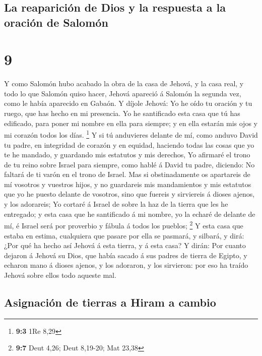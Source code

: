 \hypertarget{la-reapariciuxf3n-de-dios-y-la-respuesta-a-la-oraciuxf3n-de-salomuxf3n}{%
\subsection{La reaparición de Dios y la respuesta a la oración de
Salomón}\label{la-reapariciuxf3n-de-dios-y-la-respuesta-a-la-oraciuxf3n-de-salomuxf3n}}

\hypertarget{section-8}{%
\section{9}\label{section-8}}

 Y como Salomón hubo acabado la obra de la casa de Jehová,
y la casa real, y todo lo que Salomón quiso hacer,  Jehová
apareció á Salomón la segunda vez, como le había aparecido en Gabaón.
 Y díjole Jehová: Yo he oído tu oración y tu ruego, que
has hecho en mi presencia. Yo he santificado esta casa que tú has
edificado, para poner mi nombre en ella para siempre; y en ella estarán
mis ojos y mi corazón todos los días. \footnote{\textbf{9:3} 1Re 8,29}
 Y si tú anduvieres delante de mí, como anduvo David tu
padre, en integridad de corazón y en equidad, haciendo todas las cosas
que yo te he mandado, y guardando mis estatutos y mis derechos,
 Yo afirmaré el trono de tu reino sobre Israel para
siempre, como hablé á David tu padre, diciendo: No faltará de ti varón
en el trono de Israel.  Mas si obstinadamente os
apartareis de mí vosotros y vuestros hijos, y no guardareis mis
mandamientos y mis estatutos que yo he puesto delante de vosotros, sino
que fuereis y sirviereis á dioses ajenos, y los adorareis;
 Yo cortaré á Israel de sobre la haz de la tierra que les
he entregado; y esta casa que he santificado á mi nombre, yo la echaré
de delante de mí, é Israel será por proverbio y fábula á todos los
pueblos; \footnote{\textbf{9:7} Deut 4,26; Deut 8,19-20; Mat 23,38}
 Y esta casa que estaba en estima, cualquiera que pasare
por ella se pasmará, y silbará, y dirá: ¿Por qué ha hecho así Jehová á
esta tierra, y á esta casa?  Y dirán: Por cuanto dejaron á
Jehová su Dios, que había sacado á sus padres de tierra de Egipto, y
echaron mano á dioses ajenos, y los adoraron, y los sirvieron: por eso
ha traído Jehová sobre ellos todo aqueste mal.

\hypertarget{asignaciuxf3n-de-tierras-a-hiram-a-cambio}{%
\subsection{Asignación de tierras a Hiram a
cambio}\label{asignaciuxf3n-de-tierras-a-hiram-a-cambio}}

